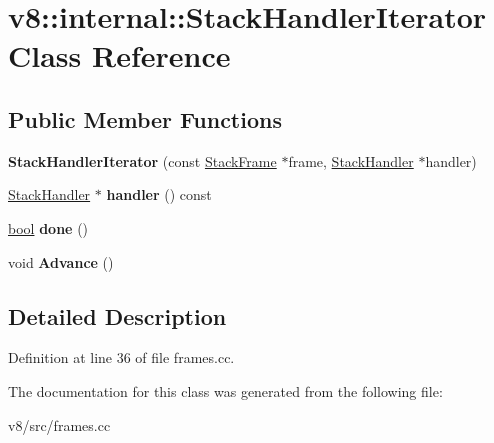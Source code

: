 \hypertarget{classv8_1_1internal_1_1StackHandlerIterator}{}\section{v8\+:\+:internal\+:\+:Stack\+Handler\+Iterator Class Reference}
\label{classv8_1_1internal_1_1StackHandlerIterator}
\subsection*{Public Member Functions}
\begin{DoxyCompactItemize}
\item 
\mbox{\label{classv8_1_1internal_1_1StackHandlerIterator_a50d3e9cba310dc834852d96ea57b2c1b}} 
{\bfseries Stack\+Handler\+Iterator} (const \mbox{\hyperlink{classv8_1_1internal_1_1StackFrame}{Stack\+Frame}} $\ast$frame, \mbox{\hyperlink{classv8_1_1internal_1_1StackHandler}{Stack\+Handler}} $\ast$handler)
\item 
\mbox{\label{classv8_1_1internal_1_1StackHandlerIterator_ae5991ba4875106c9a5d24a5596f15089}} 
\mbox{\hyperlink{classv8_1_1internal_1_1StackHandler}{Stack\+Handler}} $\ast$ {\bfseries handler} () const
\item 
\mbox{\label{classv8_1_1internal_1_1StackHandlerIterator_a5cba6d55b733036f3598a40dda685f9e}} 
\mbox{\hyperlink{classbool}{bool}} {\bfseries done} ()
\item 
\mbox{\label{classv8_1_1internal_1_1StackHandlerIterator_ac6ca34d63d4c39ceeb854aa03389e08e}} 
void {\bfseries Advance} ()
\end{DoxyCompactItemize}


\subsection{Detailed Description}


Definition at line 36 of file frames.\+cc.



The documentation for this class was generated from the following file\+:\begin{DoxyCompactItemize}
\item 
v8/src/frames.\+cc\end{DoxyCompactItemize}
